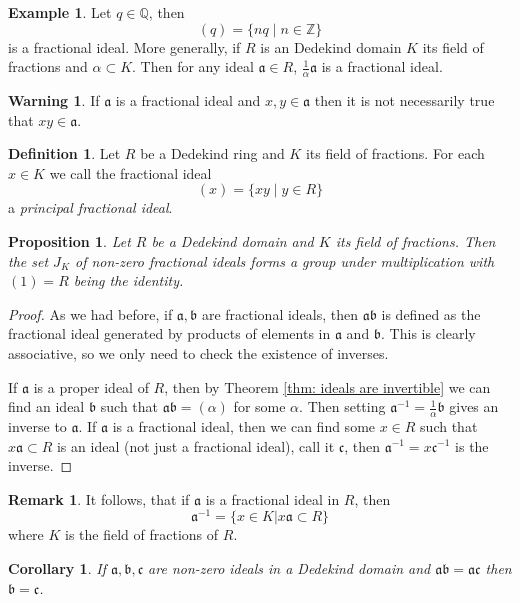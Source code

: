 \documentclass[11pt,a4paper]{report}
\theoremstyle{plain}
\newtheorem{corollary}[subsection]{Corollary}
\newtheorem{prop}[subsection]{Proposition}
\theoremstyle{definition}
\newtheorem{definition}[subsection]{Definition}
\newtheorem{exmp}[subsection]{Example}
\theoremstyle{definition}
\newtheorem{rmrk}[subsection]{Remark}
\newtheorem{warn}[subsection]{Warning}
\newcommand{\ZZ}{\mathbb{Z}}
\def\QQ{\mathbb{Q}}
\def\gothb{\mathfrak{b}}
\def\gothc{\mathfrak{c}}
\def \a{\alpha}
\def\gotha{\mathfrak{a}}
\begin{document}
	\begin{exmp}
		Let $q \in \QQ$, then \[(q)=\{nq \mid n \in \ZZ\}\] is a fractional ideal. More generally, if $R$ is an Dedekind domain $K$ its field of fractions and $\a \subset K$. Then for any ideal $\gotha \in R$, $\frac{1}{\a}\gotha$ is a fractional ideal.
	\end{exmp}
	
	\begin{warn}
		If $\gotha$ is a fractional ideal and $x,y \in \gotha$ then it is not necessarily true that $xy \in \gotha$.
	\end{warn}
	\begin{definition}\label{definition: princ frac ideal}
		Let $R$ be a Dedekind ring and $K$ its field of fractions. For each $x \in K$ we call the fractional ideal \[(x)=\{xy\mid y \in R\}\] a \textit{principal fractional ideal}.
	\end{definition}
	\begin{prop}\label{prop: frac ideals form grp}
		Let $R$ be a Dedekind domain and $K$ its field of fractions. Then the set $J_K$ of non-zero fractional ideals forms a group under multiplication with $(1)=R$ being the identity.
	\end{prop}
	
	\begin{proof}
		As we had before, if $\gotha,\gothb$ are fractional ideals, then $\gotha\gothb$ is defined as the fractional ideal generated by products of elements in $\gotha$ and $\gothb$. This is clearly associative, so we only need to check the existence of inverses.
		
		If $\gotha$ is a proper ideal of $R$, then by Theorem \ref{thm: ideals are invertible} we can find an ideal $\gothb$ such that $\gotha \gothb =(\a)$ for some $\a$. Then setting $\gotha^{-1}=\frac{1}{\a}\gothb$ gives an inverse to $\gotha$. If $\gotha$ is a fractional ideal, then we can find some $x \in R$ such that $x \gotha \subset R$ is an ideal (not just a fractional ideal), call it $\gothc$, then $\gotha^{-1}=x\gothc^{-1}$ is the inverse. 
	\end{proof}
	
	\begin{rmrk}
		It follows, that if $\gotha$ is a fractional ideal in $R$, then \[\gotha^{-1}=\{x \in K | x\gotha \subset R \}\] where $K$ is the field of fractions of $R$.
	\end{rmrk}
	
	
	\begin{corollary}\label{cor: cancel of ideals}
		If $\gotha,\gothb,\gothc$ are non-zero ideals in a Dedekind domain and $\gotha\gothb=\gotha\gothc$ then $\gothb=\gothc$.
	\end{corollary}
	
\end{document}
